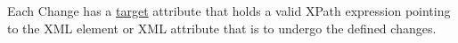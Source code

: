 Each Change has a \hyperref[sec:target]{target} attribute that holds a valid XPath expression pointing to the XML element or XML attribute that is to undergo the defined changes.


  

  

  

  

  

  



